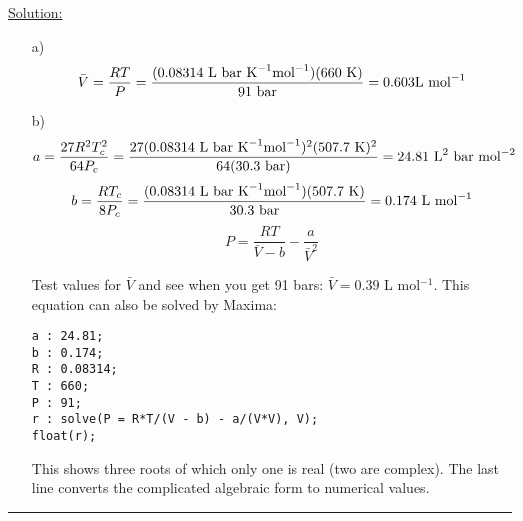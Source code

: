 \noindent
\underline{Solution:}\\

\begin{itemize}

\item[a)] $$\bar{V} = \frac{RT}{P} = \frac{(0.08314\textnormal{ L bar K}^{-1}\textnormal{mol}^{-1})(660\textnormal{ K})}{91\textnormal{ bar}} = 0.603\textnormal{L mol}^{-1}$$

\item[b)] $$a = \frac{27R^2T_c^2}{64P_c} = \frac{27(0.08314\textnormal{ L bar K}^{-1}\textnormal{mol}^{-1})^2(507.7\textnormal{ K})^2}{64(30.3\textnormal{ bar})} = 24.81\textnormal{ L}^2\textnormal{ bar mol}^{-2}$$
$$b = \frac{RT_c}{8P_c} = \frac{(0.08314\textnormal{ L bar K}^{-1}\textnormal{mol}^{-1})(507.7\textnormal{ K})}{30.3\textnormal{ bar}} = 0.174\textnormal{ L mol}^{-1}$$
$$P = \frac{RT}{\bar{V} - b} - \frac{a}{\bar{V}^2}$$

Test values for $\bar{V}$ and see when you get 91 bars: $\bar{V} = 0.39$ L mol$^{-1}$. This equation can also be solved by Maxima:

\begin{verbatim}
a : 24.81;
b : 0.174;
R : 0.08314;
T : 660;
P : 91;
r : solve(P = R*T/(V - b) - a/(V*V), V);
float(r);
\end{verbatim}

This shows three roots of which only one is real (two are complex). The last line converts the complicated algebraic form to numerical values.

\end{itemize}

\hrule\vspace{0.5cm}
